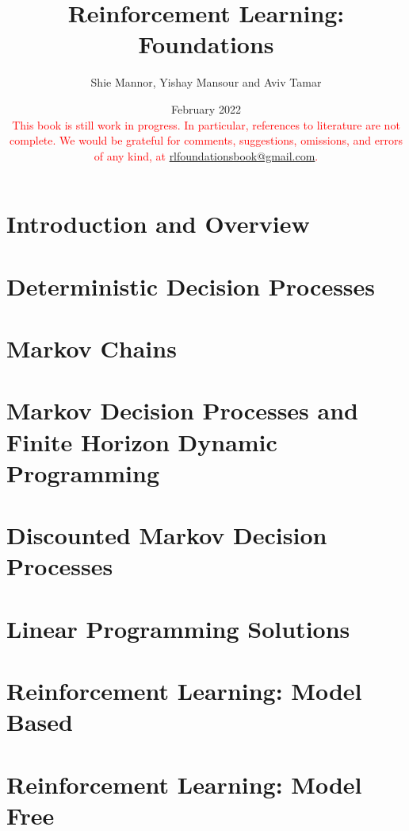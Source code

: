 \documentclass[12pt]{book}
\title{Reinforcement Learning: Foundations}
\date{February 2022
\\
  \textcolor{red}{This book is still work in progress. In particular, references to literature are not complete. We would be grateful for comments, suggestions, omissions, and errors of any kind, at \url{rlfoundationsbook@gmail.com}. }
}
\author{Shie Mannor, Yishay Mansour and Aviv Tamar}
\begin{document}
\maketitle

\tableofcontents

\chapter{Introduction and Overview}
\label{chapter:intro}


\chapter{Deterministic Decision Processes}
\label{chapter:DDP}


\chapter{Markov Chains}
\label{chapter:MC}


\chapter{Markov Decision Processes and Finite Horizon Dynamic Programming}
\label{chapter:MDP-FH}


\chapter{Discounted Markov Decision Processes}
\label{chapter:disc}


\chapter{Linear Programming Solutions}\label{chapter-LP}


\chapter{Reinforcement Learning: Model Based}\label{chapter-model-based}




\chapter{Reinforcement Learning: Model Free}
\label{chapter:learning-model-free}

\newpage

\end{document}
